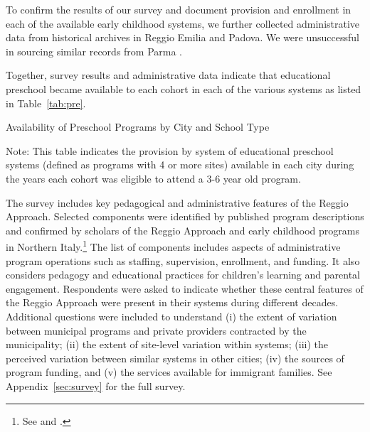 To confirm the results of our survey and document provision and enrollment in each of the available early childhood systems, we further collected administrative data from historical archives in Reggio Emilia and Padova. We were unsuccessful in sourcing similar records from Parma \citep{Padova-Admin-Data_1964-2011,Reggio-Admin-data_1966-2006,Reggio-Annual-Journals_1994-2011}. 

Together, survey results and administrative data indicate that educational preschool became available to each cohort in each of the various systems as listed in Table~\ref{tab:pre}. 

\begin{table}[H]
\centering
\caption{Availability of Preschool Programs by City and School Type}\label{tab:pre}
\begin{adjustbox}{width=\textwidth}
\begin{threeparttable}
	
\begin{tablenotes}
Note: This table indicates the provision by system of educational preschool systems (defined as programs with 4 or more sites) available in each city during the years each cohort was eligible to attend a 3-6 year old program. 
\end{tablenotes}
\end{threeparttable}
\end{adjustbox}
\end{table}

The survey includes key pedagogical and administrative features of the Reggio Approach. Selected components were identified by published program descriptions and confirmed by scholars of the Reggio Approach and early childhood programs in Northern Italy.\footnote{See \citet{Edwards-etal-eds_1998_Hundred-Languages} and \citet{Corsaro_2008_Policy-Practice}.} The list of components includes aspects of administrative program operations such as staffing, supervision, enrollment, and funding. It also considers pedagogy and educational practices for children's learning and parental engagement. Respondents were asked to indicate whether these central features of the Reggio Approach were present in their systems during different decades. Additional questions were included to understand (i) the extent of variation between municipal programs and private providers contracted by the municipality; (ii) the extent of site-level variation within systems; (iii) the perceived variation between similar systems in other cities; (iv) the sources of program funding, and (v) the services available for immigrant families. See Appendix~\ref{sec:survey} for the full survey. 

